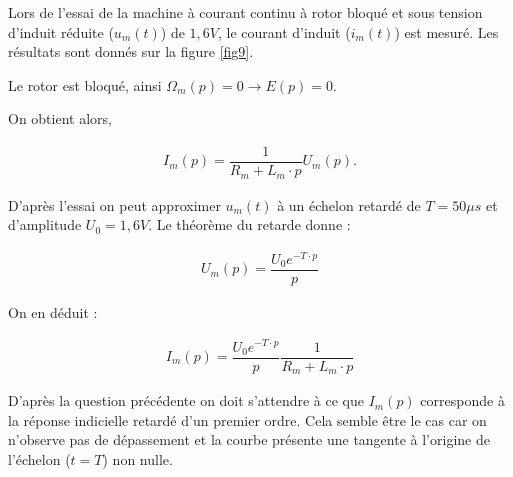 Lors de l'essai de la machine à courant continu à rotor bloqué et sous tension d'induit réduite ($u_m(t)$) de $1,6 V$, le courant d'induit ($i_m(t)$) est mesuré. Les résultats sont donnés sur la figure \ref{fig9}.

\ifprof
\begin{corrige}
Le rotor est bloqué, ainsi $\Omega_m(p)=0\rightarrow E(p)=0$.

On obtient alors,

\begin{align*}
I_m(p)=\dfrac{1}{R_m+L_m\cdot p}U_m(p).
\end{align*}

\end{corrige}
\else
\fi

\ifprof
\begin{corrige}
D'après l'essai on peut approximer $u_m(t)$ à un échelon retardé de $T=50\mu s$ et d'amplitude $U_0=1,6V$.
Le théorème du retarde donne : 

\begin{align*}
U_m(p)=\dfrac{U_0e^{-T\cdot p}}{p}
\end{align*}

On en déduit : 

\begin{align*}
I_m(p)=\dfrac{U_0e^{-T\cdot p}}{p}\dfrac{1}{R_m+L_m\cdot p}
\end{align*}

\end{corrige}
\else
\fi


\ifprof
\begin{corrige}
D'après la question précédente on doit s'attendre à ce que $I_m(p)$ corresponde à la réponse indicielle retardé d'un premier ordre. Cela semble être le cas car on n'observe pas de dépassement et la courbe présente une tangente à l'origine de l'échelon ($t=T$) non nulle.

\end{corrige}
\else
\fi


